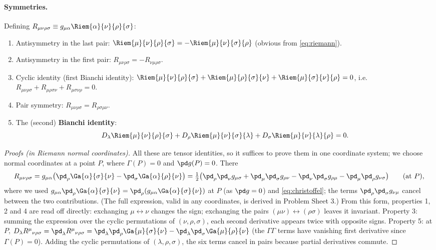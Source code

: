 \paragraph{Symmetries.} Defining $R_{\mu\nu\rho\sigma}\equiv g_{\mu\alpha}\Riem{\alpha}{\nu}{\rho}{\sigma}$:
\begin{enumerate}
\item Antisymmetry in the last pair: $\Riem{\mu}{\nu}{\rho}{\sigma}=-\Riem{\mu}{\nu}{\sigma}{\rho}$ (obvious from \eqref{eq:riemann}).
\item Antisymmetry in the first pair: $R_{\mu\nu\rho\sigma}=-R_{\nu\mu\rho\sigma}$.
\item Cyclic identity (first Bianchi identity): $\Riem{\mu}{\nu}{\rho}{\sigma}+\Riem{\mu}{\rho}{\sigma}{\nu}+\Riem{\mu}{\sigma}{\nu}{\rho}=0$, i.e.\ $R_{\mu\nu\rho\sigma}+R_{\mu\rho\sigma\nu}+R_{\mu\sigma\nu\rho}=0$.
\item Pair symmetry: $R_{\mu\nu\rho\sigma}=R_{\rho\sigma\mu\nu}$.
\item The (second) \textbf{Bianchi identity}:
\begin{equation}
  D_\lambda\Riem{\mu}{\nu}{\rho}{\sigma}+D_\rho\Riem{\mu}{\nu}{\sigma}{\lambda}+D_\sigma\Riem{\mu}{\nu}{\lambda}{\rho}=0 .
  \label{eq:bianchi}
\end{equation}
\end{enumerate}
\begin{proof}[Proofs (in Riemann normal coordinates)]
All these are tensor identities, so it suffices to prove them in one coordinate system; we choose normal coordinates at a point $P$, where $\Gamma(P)=0$ and $\pd g(P)=0$. There
\[
  R_{\mu\nu\rho\sigma}=g_{\mu\alpha}\big(\pd_\rho\Ga{\alpha}{\sigma}{\nu}-\pd_\sigma\Ga{\alpha}{\rho}{\nu}\big)
  =\tfrac12\big(\pd_\rho\pd_\nu g_{\mu\sigma}+\pd_\mu\pd_\sigma g_{\rho\nu}-\pd_\nu\pd_\sigma g_{\rho\mu}-\pd_\mu\pd_\rho g_{\nu\sigma}\big)\qquad\text{(at $P$)},
\]
where we used $g_{\mu\alpha}\pd_\rho\Ga{\alpha}{\sigma}{\nu}=\pd_\rho(g_{\mu\alpha}\Ga{\alpha}{\sigma}{\nu})$ at $P$ (as $\pd g=0$) and \eqref{eq:christoffel}; the terms $\pd_\rho\pd_\sigma g_{\nu\mu}$ cancel between the two contributions. (The full expression, valid in any coordinates, is derived in Problem Sheet 3.) From this form, properties 1, 2 and 4 are read off directly: exchanging $\mu\leftrightarrow\nu$ changes the sign; exchanging the pairs $(\mu\nu)\leftrightarrow(\rho\sigma)$ leaves it invariant. Property 3: summing the expression over the cyclic permutations of $(\nu,\rho,\sigma)$, each second derivative appears twice with opposite signs. Property 5: at $P$, $D_\lambda R^\mu{}_{\nu\rho\sigma}=\pd_\lambda R^\mu{}_{\nu\rho\sigma}=\pd_\lambda\pd_\rho\Ga{\mu}{\sigma}{\nu}-\pd_\lambda\pd_\sigma\Ga{\mu}{\rho}{\nu}$ (the $\Gamma\Gamma$ terms have vanishing first derivative since $\Gamma(P)=0$). Adding the cyclic permutations of $(\lambda,\rho,\sigma)$, the six terms cancel in pairs because partial derivatives commute.
\end{proof}

